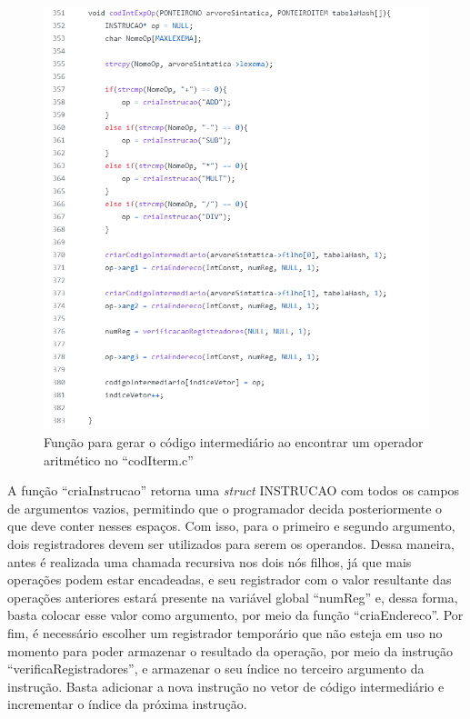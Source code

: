 \documentclass[
	12pt,				%
	oneside,
	a4paper,			%
	english,			%
	french,				%
	spanish,			%
	brazil,				%
	]{abntex2}
\begin{document}
\begin{figure}[H]
\centering 
\caption{Função para gerar o código intermediário ao encontrar um operador aritmético no \nohyphens{``codIterm.c''}} 
\label{fig:CodIntermOp}
\graphicspath{ {./imgs/} } 
\includegraphics[scale=0.5]{imgs/Codigo/CodIntermOp.png}
\end{figure}


A função ``criaInstrucao'' retorna uma \emph{struct} INSTRUCAO com todos os campos de argumentos vazios, permitindo que o programador decida posteriormente o que deve conter nesses espaços. Com isso, para o primeiro e segundo argumento, dois registradores devem ser utilizados para serem os operandos. Dessa maneira, antes é realizada uma chamada recursiva nos dois nós filhos, já que mais operações podem estar encadeadas, e seu registrador com o valor resultante das operações anteriores estará presente na variável global ``numReg'' e, dessa forma, basta colocar esse valor como argumento, por meio da função ``criaEndereco''. Por fim, é necessário escolher um registrador temporário que não esteja em uso no momento para poder armazenar o resultado da operação, por meio da instrução ``verificaRegistradores'', e armazenar o seu índice no terceiro argumento da instrução. Basta adicionar a nova instrução no vetor de código intermediário e incrementar o índice da próxima instrução.
\end{document}
